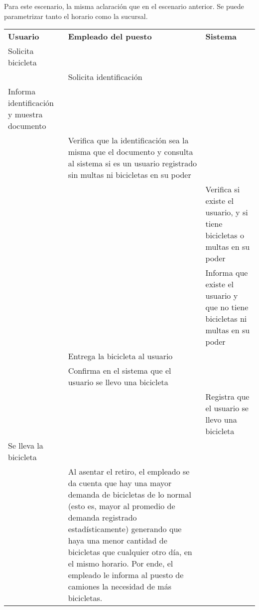 \documentclass[a4paper, 11pt, spanish]{article}
\begin{document}
Para este escenario, la misma aclaración que en el escenario anterior. Se puede parametrizar tanto el horario como la sucursal.

\begingroup
    \fontsize{8pt}{12pt}\selectfont

\begin{tabular}{|p{5cm}|p{5cm}|p{5cm}|}
\cline{1-3}
\textbf{Usuario} & \textbf{Empleado del puesto} & \textbf{Sistema} \\ \cline{1-3}
Solicita bicicleta&&\\ \cline{1-3}
&Solicita identificación&\\ \cline{1-3}
Informa identificación y muestra documento&&\\ \cline{1-3}
&Verifica que la identificación sea la misma que el documento y consulta al sistema si es un usuario registrado sin multas ni bicicletas en su poder&\\ \cline{1-3}
&&Verifica si existe el usuario, y si tiene bicicletas o multas en su poder\\ \cline{1-3}
&&Informa que existe el usuario y que no tiene bicicletas ni multas en su poder\\ \cline{1-3}
&Entrega la bicicleta al usuario&\\ \cline{1-3}
&Confirma en el sistema que el usuario se llevo una bicicleta&\\ \cline{1-3}
&&Registra que el usuario se llevo una bicicleta\\ \cline{1-3}
Se lleva la bicicleta&&\\ \cline{1-3}
&Al asentar el retiro, el empleado se da cuenta que hay una mayor demanda de bicicletas de lo normal (esto es, mayor al promedio de demanda registrado estadísticamente) generando que haya una menor cantidad de bicicletas que cualquier otro día, en el mismo horario. Por ende, el empleado le informa al puesto de camiones la necesidad de más bicicletas. &\\ \cline{1-3}
\end{tabular}

\endgroup
\end{document}
